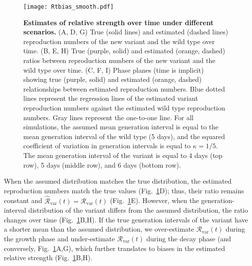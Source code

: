\documentclass[12pt]{article}
\newcommand{\fref}[1]{Fig.~\ref{fig:#1}}
\newcommand{\vvvar}{\mathrm{var}}
\newcommand{\Rx}[1]{\ensuremath{{\mathcal R}_{#1}}\xspace}
\newcommand{\RR}{\ensuremath{{\mathcal R}}\xspace}
\newcommand{\Rv}{\Rx{\vvvar}}
\begin{document}
\begin{figure}[!pht]
\begin{center}
\texttt{[image: Rtbias\_smooth.pdf]}
\caption{
\textbf{Estimates of relative strength over time under different scenarios.}
(A, D, G) True (solid lines) and estimated (dashed lines) reproduction numbers of the new variant and the wild type over time.
(B, E, H) True (purple, solid) and estimated (orange, dashed) ratios between reproduction numbers of the new variant and the wild type over time.
(C, F, I) Phase planes (time is implicit) showing true (purple, solid) and estimated (orange, dashed) relationships between estimated reproduction numbers.
Blue dotted lines represent the regression lines of the estimated variant reproduction numbers against the estimated wild type reproduction numbers.
Gray lines represent the one-to-one line.
For all simulations, the assumed mean generation interval is equal to the mean generation interval of the wild type (5 days), and the squared coefficient of variation in generation intervals is equal to $\kappa = 1/5$.
The mean generation interval of the variant is equal to 4 days (top row), 5 days (middle row), and 6 days (bottom row).
}
\label{fig:Rtbias}
\end{center}
\end{figure}

When the assumed distribution matches the true distribution, the estimated reproduction numbers match the true values (\fref{Rtbias}D); thus, their ratio remains constant and $\hat{\RR}_{\textrm{var}}(t)=\Rv(t)$ (\fref{Rtbias}E).
However, when the generation-interval distribution of the variant differs from the assumed distribution, the ratio changes over time (\fref{Rtbias}B,H).
If the true generation intervals of the variant have a shorter mean than the assumed distribution, we over-estimate $\Rv(t)$ during the growth phase and under-estimate $\Rv(t)$ during the decay phase (and conversely, \fref{Rtbias}A,G), which further translates to biases in the estimated relative strength (\fref{Rtbias}B,H).
\end{document}
